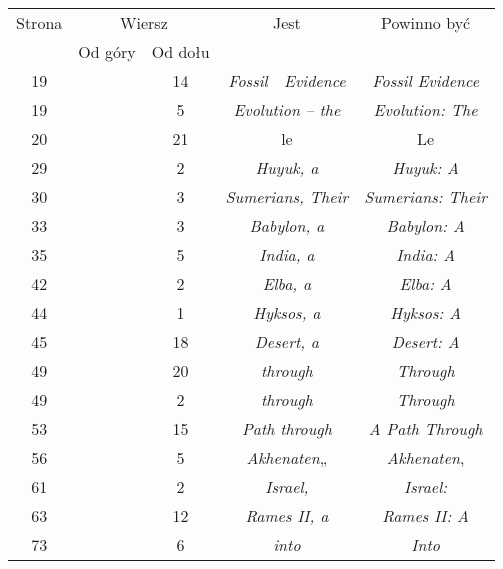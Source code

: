 \documentclass[a4paper,11pt]{article}
\begin{document}







\newpage



\begin{center}

  \begin{tabular}{|c|c|c|c|c|}
    \hline
    Strona & \multicolumn{2}{c|}{Wiersz} & Jest
                              & Powinno być \\ \cline{2-3}
    & Od góry & Od dołu & & \\
    \hline
    19  & & 14 & \textit{Fossil~~Evidence} & \textit{Fossil Evidence} \\
    19  & & \hphantom{0}5 & \textit{Evolution -- the}
    & \textit{Evolution: The} \\
    20  & & 21 & le & Le \\
    29  & & \hphantom{0}2 & \textit{Huyuk, a} & \textit{Huyuk: A} \\
    30  & & \hphantom{0}3 & \textit{Sumerians, Their}
    & \textit{Sumerians: Their} \\
    33  & & \hphantom{0}3 & \textit{Babylon, a} & \textit{Babylon: A} \\
    35  & & \hphantom{0}5 & \textit{India, a} & \textit{India: A} \\
    42  & & \hphantom{0}2 & \textit{Elba, a} & \textit{Elba: A} \\
    44  & & \hphantom{0}1 & \textit{Hyksos, a} & \textit{Hyksos: A} \\
    45  & & 18 & \textit{Desert, a} & \textit{Desert: A} \\
    49  & & 20 & \textit{through} & \textit{Through} \\
    49  & & \hphantom{0}2 & \textit{through} & \textit{Through} \\
    53  & & 15 & \textit{Path through} & \textit{A Path Through} \\
    56  & & \hphantom{0}5 & \textit{Akhenaten}„
           & \textit{Akhenaten}, \\
    61  & & \hphantom{0}2 & \textit{Israel,} & \textit{Israel:} \\
    63  & & 12 & \textit{Rames II, a} & \textit{Rames II: A} \\
    73  & & \hphantom{0}6 & \textit{into} & \textit{Into} \\

\end{tabular}
\end{center}
\end{document}
